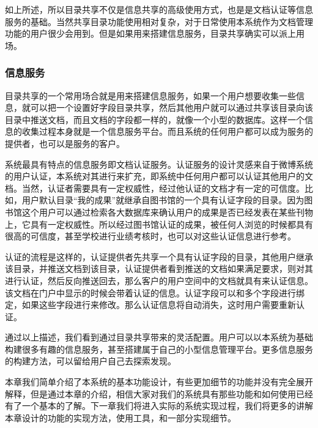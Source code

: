 如上所述，所以目录共享不仅是信息共享的高级使用方式，也是是文档认证等信息服务的基础。当然共享目录功能使用相对复杂，对于日常使用本系统作为文档管理功能的用户很少会用到。但是如果用来搭建信息服务，目录共享确实可以派上用场。

\subsubsection{信息服务}
\label{sec:service}

目录共享的一个常用场合就是用来搭建信息服务，如果一个用户想要收集一些信息，就可以把一个设置好字段目录共享，然后其他用户就可以通过共享该目录向该目录中推送文档，而且文档的字段都一样的，就像一个小型的数据库。这样一个信息的收集过程本身就是一个信息服务平台。而且系统的任何用户都可以成为服务的提供者，也可以是服务的客户。

系统最具有特点的信息服务即文档认证服务。认证服务的设计灵感来自于微博系统的用户认证，本系统对其进行来扩充，即系统中任何用户都可以认证其他用户的文档。当然，认证者需要具有一定权威性，经过他认证的文档才有一定的可信度。比如，用户默认目录“我的成果”就继承自图书馆的一个具有认证字段的目录。因为图书馆这个用户可以通过检索各大数据库来确认用户的成果是否已经发表在某些刊物上，它具有一定权威性。所以经过图书馆认证的成果，被任何人浏览的时候都具有很高的可信度，甚至学校进行业绩考核时，也可以对这些认证信息进行参考。

认证的流程是这样的，认证提供者先共享一个具有认证字段的目录，其他用户继承该目录，并推送文档到该目录，认证提供者看到推送的文档如果满足要求，则对其进行认证，然后反向推送回去，那么客户的用户空间中的文档就具有来认证信息。该文档在门户中显示的时候会带着认证的信息。认证字段可以和多个字段进行绑定，如果这些字段进行来修改。那么认证信息将自动消失，这时用户需要重新认证。

通过以上描述，我们看到通过目录共享带来的灵活配置。用户可以以本系统为基础构建很多有趣的信息服务，甚至搭建属于自己的小型信息管理平台。更多信息服务的构建方法，可以留给用户自己去探索发现。

本章我们简单介绍了本系统的基本功能设计，有些更加细节的功能并没有完全展开解释，但是通过本章的介绍，相信大家对我们的系统具有那些功能和如何使用已经有了一个基本的了解。下一章我们将进入实际的系统实现过程，我们将更多的讲解本章设计的功能的实现方法，使用工具，和一部分实现细节。